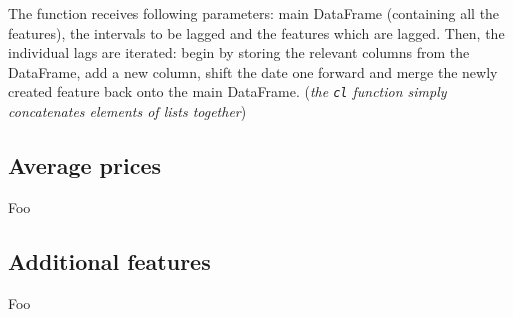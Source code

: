 

The function receives following parameters: main DataFrame (containing all the features), the intervals to be lagged and the features which are lagged. Then, the individual lags are iterated: begin by storing the relevant columns from the DataFrame, add a new column, shift the date one forward and merge the newly created feature back onto the main DataFrame. (\textit{the \texttt{cl} function simply concatenates elements of lists together})


\subsection{Average prices}

Foo

\subsection{Additional features}

Foo
